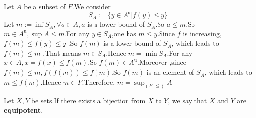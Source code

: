 \documentclass{book}
\numberwithin{equation}{section}
\begin{document}
\begin{proofenv}
    Let $A$ be a subset of $F$.We consider 
    $$S_A:=\{y\in A^\mathrm{u}|f(y)\le y\}$$
    Let $m:=\inf S_A,\forall a\in A,a$ is a lower bound of $S_A$.So $a\le m$.So $m\in A^\mathrm{u},\sup A\le m$.For any $y\in S_A$,one has $m\le y$.Since $f$ is increasing, $f(m)\le f(y)\le y$ .So $f(m)$ is a lower bound of $S_A$, which leads to $f(m)\le m$ .That means $m\in S_A$.Hence $m=\min S_A$.For any $x\in A,x=f(x)\le f(m)$.So $f(m)\in A^\mathrm{u}$.Moreover ,since $f(m)\le m ,f(f(m))\le f(m)$.So $f(m)$ is an element of $S_A$, which leads to $m\le f(m)$.Hence $m\in F$.Therefore, $m=\sup_{(F,\le)}A$
\end{proofenv}
\begin{definitionenv}
    Let $X,Y$ be sets.If there exists a bijection from $X$ to $Y$, we say that $X$ and $Y$ are \textbf{equipotent}.
\end{definitionenv}
\end{document}
